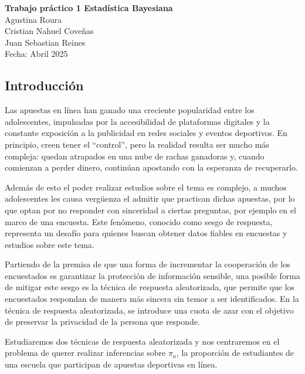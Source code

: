 \documentclass[
]{article}
\author{}
\date{\vspace{-2.5em}}
\begin{document}
\begin{titlepage}
\centering
\vspace*{4cm} %

{\Huge \textbf{Trabajo práctico 1 Estadística Bayesiana}}\\[2cm]

{\Large Agustina Roura}\\[0.5cm]
{\Large Cristian Nahuel Coveñas}\\[0.5cm]
{\Large Juan Sebastian Reines}\\[2cm]

{\large Fecha: Abril 2025}

\vfill

\end{titlepage}

\newpage

\subsection{Introducción}\label{introducciuxf3n}

Las apuestas en línea han ganado una creciente popularidad entre los adolescentes, impulsadas por la accesibilidad de plataformas digitales y la constante exposición a la publicidad en redes sociales y eventos deportivos. En principio, creen tener el ``control'', pero la realidad resulta ser mucho más compleja: quedan atrapados en una nube de rachas ganadoras y, cuando comienzan a perder dinero, continúan apostando con la esperanza de recuperarlo.

Además de esto el poder realizar estudios sobre el tema es complejo, a muchos adolescentes les causa vergüenza el admitir que practican dichas apuestas, por lo que optan por no responder con sinceridad a ciertas preguntas, por ejemplo en el marco de una encuesta. Este fenómeno, conocido como sesgo de respuesta, representa un desafío para quienes buscan obtener datos fiables en encuestas y estudios sobre este tema.

Partiendo de la premisa de que una forma de incrementar la cooperación de los encuestados es garantizar la protección de información sensible, una posible forma de mitigar este sesgo es la técnica de respuesta aleatorizada, que permite que los encuestados respondan de manera más sincera sin temor a ser identificados. En la técnica de respuesta aleatorizada, se introduce una cuota de azar con el objetivo de preservar la privacidad de la persona que responde.

Estudiaremos dos técnicas de respuesta aleatorizada y nos centraremos en el problema de querer realizar inferencias sobre \(\pi_a\), la proporción de estudiantes de una escuela que participan de apuestas deportivas en línea.
\end{document}
